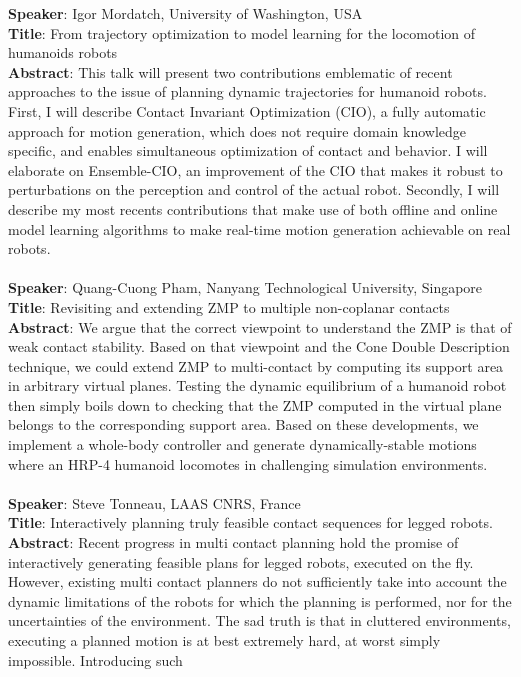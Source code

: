 \documentclass[conference]{IEEEtran}
\begin{document}
\textbf{Speaker}: Igor Mordatch, University of Washington, USA \\
\textbf{Title}: From trajectory optimization to model learning for the locomotion of humanoids robots \\
\textbf{Abstract}: This talk will present two contributions emblematic of recent approaches to the issue of planning dynamic trajectories for humanoid robots.
First, I will describe Contact Invariant Optimization (CIO), a fully automatic approach for motion generation, which does not require domain knowledge speciﬁc,
and enables simultaneous optimization of contact and behavior. I will elaborate on Ensemble-CIO, an improvement of the CIO that makes it robust to  perturbations on the perception
and control of the actual robot. Secondly, I will describe my most recents contributions that make use of both offline and online model learning algorithms to make real-time motion generation
achievable on real robots.  \\ \\
\textbf{Speaker}: Quang-Cuong Pham, Nanyang Technological University, Singapore \\
\textbf{Title}:  Revisiting and extending ZMP to multiple non-coplanar contacts \\
\textbf{Abstract}: We argue that the correct viewpoint to understand the ZMP is that of weak contact stability. Based on that viewpoint and the Cone Double Description technique, we could extend ZMP to multi-contact by computing its support area in arbitrary virtual planes. Testing the dynamic equilibrium of a humanoid robot then simply boils down to checking that the ZMP computed in the virtual plane belongs to the corresponding support area. Based on these developments, we implement a whole-body controller and generate dynamically-stable motions where an HRP-4 humanoid locomotes in challenging simulation environments.   \\ \\
\textbf{Speaker}: Steve Tonneau, LAAS CNRS, France \\
\textbf{Title}: Interactively planning truly feasible contact sequences for legged robots.\\
\textbf{Abstract}: Recent progress in multi contact planning hold the promise of interactively generating feasible plans for legged robots, executed on the fly.
However, existing multi contact planners do not sufficiently take into account the dynamic limitations of the robots for which the planning is performed, nor for the uncertainties of the environment. The sad truth is that in cluttered environments, executing a planned motion is at best extremely hard, at worst simply impossible. Introducing such
\end{document}
